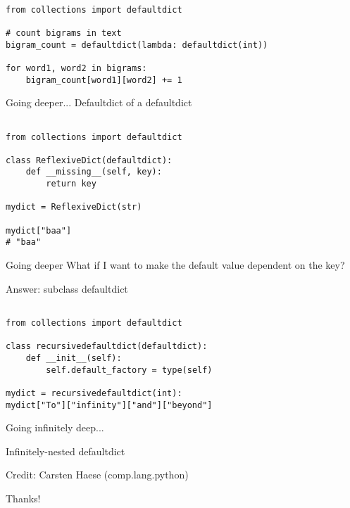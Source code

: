 \documentclass{beamer}
\begin{document}
\begin{lrbox}{\mysavebox}
\begin{lstlisting}

from collections import defaultdict

# count bigrams in text
bigram_count = defaultdict(lambda: defaultdict(int))

for word1, word2 in bigrams:
	bigram_count[word1][word2] += 1

\end{lstlisting}
\end{lrbox}

\begin{frame}{Going deeper...}
 Defaultdict of a defaultdict

\vspace{1.5em}
{\usebox{\mysavebox}}
   
\end{frame}

\begin{lrbox}{\mysavebox}
\begin{lstlisting}

from collections import defaultdict

class ReflexiveDict(defaultdict):
    def __missing__(self, key):
        return key

mydict = ReflexiveDict(str)

mydict["baa"]
# "baa"

\end{lstlisting}
\end{lrbox}

\begin{frame}{Going deeper}
 What if I want to make the default value dependent on the key?

 \bigskip

 Answer: subclass defaultdict
 
\vspace{1em}
{\usebox{\mysavebox}}
    
\end{frame}

\begin{lrbox}{\mysavebox}
\begin{lstlisting}

from collections import defaultdict

class recursivedefaultdict(defaultdict):
    def __init__(self):
        self.default_factory = type(self)

mydict = recursivedefaultdict(int):
mydict["To"]["infinity"]["and"]["beyond"]

\end{lstlisting}
\end{lrbox}


\begin{frame}{Going infinitely deep...}

Infinitely-nested defaultdict

\usebox{\mysavebox}

\bigskip
Credit: Carsten Haese (comp.lang.python)

\end{frame}

\begin{frame}{}

\begin{center}Thanks!\end{center}

\end{frame}
\end{document}
